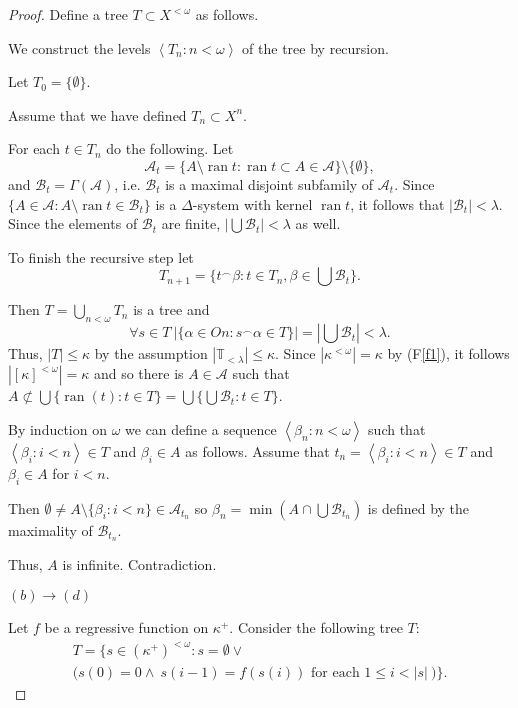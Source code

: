 \documentclass[a4paper,10pt,reqno]{amsart}
\numberwithin{equation}{section}
\theoremstyle{definition}
\theoremstyle{remark}
\newcommand{\mc}[1]{\mathcal{#1}}
\newcommand{\mbb}[1]{\mathbb{#1}}
\newcommand{\setm}{\setminus}
\newcommand{\empt}{\emptyset}
\newcommand{\subs}{\subset}
\newcommand{\ran}{\operatorname{ran}}
\def\<{\left\langle}
\def\>{\right\rangle}
\begin{document}
\begin{proof}
Define a tree $T\subs X^{<{\omega}}$ as follows.

We construct the levels $\<T_n:n<{\omega}\>$  of the tree by recursion. 

Let $T_0=\{\empt\}$.

Assume that we have defined $T_n\subs X^n$.

For each $t\in T_n$ do the following. Let 
$$\mc A_t=\{A\setm \ran t:\ran t\subs A\in \mc A\}\setm \{\empt\},$$
and  $\mc B_t=\Gamma(\mc A)$, i.e. $\mc B_t$ is a maximal disjoint subfamily of $\mc A_t$.
Since $\{A\in \mc A: A\setm \ran t\in \mc B_t\}$ is a $\Delta$-system with kernel $\ran t$,
it follows that $|\mc B_t|<{\lambda}$. Since the elements of $\mc B_t$ are finite, $|\bigcup \mc B_t|<{\lambda}$ as well.

To finish the recursive step let 
\begin{displaymath}
T_{n+1}=    
\{t^\frown {\beta}:t\in T_n, {\beta}\in \bigcup \mc B_t\}.
\end{displaymath}

Then $T=\bigcup_{n<{\omega}}T_n$ is a tree and 
\begin{displaymath}
    \forall s\in T\ |\{{\alpha}\in On: s^\frown {\alpha}\in T\}|=|\bigcup \mc B_t|<{\lambda}.
    \end{displaymath}
Thus, $|T|\le  {\kappa}$ by the assumption $|\mbb T_{<{\lambda}}|\le {{\kappa}}$. 
Since $|{\kappa}^{<{\omega}}|={\kappa}$ by (F\ref{f1}), it follows 
$|{[{\kappa}]}^{<{\omega}}|={\kappa}$ and so  
there is $A\in \mc A$ such that $A\not\subset \bigcup \{\ran(t):t\in T\}=\bigcup\{\bigcup \mc B_t:t\in T\}$.

By induction on ${\omega}$ we can 
define a sequence $\<{\beta}_n:n<{\omega}\>$ such that $\<{\beta}_i:i<n\>\in T$ and ${\beta}_i\in A$ as follows.
Assume that $t_n=\<{\beta}_i:i<n\>\in T$ and ${\beta}_i\in A$ for $i<n$.

Then $\empt\ne A\setm \{{\beta}_i:i<n\}\in \mc A_{t_n}$ so ${\beta}_n=\min (A\cap \bigcup \mc B_{t_n})$ is defined by the maximality of $\mc B_{t_n}$.

Thus, $A$ is infinite. Contradiction.

\medskip

\noindent $(b)\to (d)$

Let $f$ be a regressive function on ${\kappa}^+$.
Consider the following tree $T$:
    \begin{multline*}
        T=\big\{s\in ({\kappa}^+)^{<{\omega}}: s=\empt \lor\\ \big (s(0)=0\land   
        \ s(i-1)=f(s(i))\text{ for each } 1\le i<|s|\ \big) \big\}.
    \end{multline*}


\end{proof}
\end{document}
